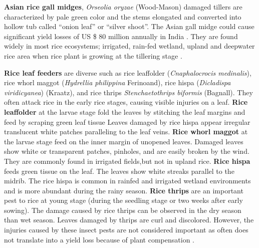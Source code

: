 \textbf{Asian rice gall midges}, \textit{Orseolia oryzae} (Wood-Mason) damaged tillers are characterized by pale green color and the stems elongated and converted into hollow tub called ``onion leaf'' or ``silver shoot''. The Asian gall midge could cause significant yield losses of US \$ 80 million annually in India \citep{Bennett_2004_New}. They are found widely in most rice ecosystems; irrigated, rain-fed wetland, upland and deepwater rice area when rice plant is growing at the tillering stage \citep{Pathak_1994_Insect}. 

\textbf{Rice leaf feeders} are diverse such as  rice leaffolder (\textit{Cnaphalocrocis medinalis}), rice whorl maggot (\textit{Hydrellia philippina} Ferinoand), rice hispa (\textit{Dicladispa viridicyanea}) (Kraatz), and  rice thrips \textit{Stenchaetothrips biformis} (Bagnall). They often attack rice in the early rice stages, causing visible injuries on a leaf. \textbf{Rice leaffolder} at the larvae stage fold the leaves by stitching the leaf margins and feed by scraping green leaf tissue Leaves damaged by rice hispa appear irregular translucent white patches paralleling to the leaf veins. \textbf{Rice whorl maggot} at the larvae stage feed on the inner margin of unopened leaves. Damaged leaves show white or transparent patches, pinholes, and are easily broken by the wind. They are commonly found in irrigated fields,but not in upland rice. \textbf{Rice hispa} feeds green tissue on the leaf. The leaves show white streaks parallel to the midrib. The rice hispa is common in rainfed and irrigated wetland environments and is more abundant during the rainy season. \textbf{Rice thrips} are an important pest to rice at young stage (during the seedling stage or two weeks after early sowing). The damage caused by rice thrips can be observed in the dry season than wet season. Leaves damaged by thrips are curl and discolored. However, the injuries caused by these insect pests are not considered important as often does not translate into a yield loss because of plant compensation \citep{Pathak_1994_Insect,Shepard_1995_Rice}.


